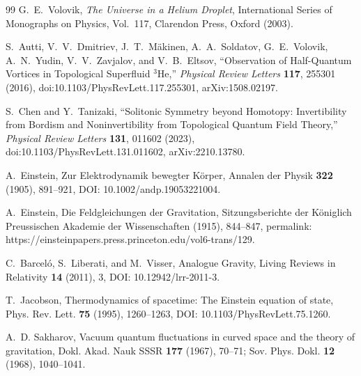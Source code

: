 \documentclass[11pt]{article}
\theoremstyle{definition}
\theoremstyle{plain}
\theoremstyle{remark}
\begin{document}
\begin{thebibliography}{99}
            G.~E.~Volovik,
            \newblock \textit{The Universe in a Helium Droplet},
            \newblock International Series of Monographs on Physics, Vol.~117,
            \newblock Clarendon Press, Oxford (2003).

            S.~Autti, V.~V.~Dmitriev, J.~T.~M\"akinen, A.~A.~Soldatov,
            G.~E.~Volovik, A.~N.~Yudin, V.~V.~Zavjalov, and V.~B.~Eltsov,
            \newblock ``Observation of Half-Quantum Vortices in Topological Superfluid $^3$He,''
            \newblock \textit{Physical Review Letters} \textbf{117}, 255301 (2016),
            \newblock doi:10.1103/PhysRevLett.117.255301,
            \newblock arXiv:1508.02197.

            S.~Chen and Y.~Tanizaki,
            \newblock ``Solitonic Symmetry beyond Homotopy:
            Invertibility from Bordism and Noninvertibility from Topological Quantum Field Theory,''
            \newblock \textit{Physical Review Letters} \textbf{131}, 011602 (2023),
            \newblock doi:10.1103/PhysRevLett.131.011602,
            \newblock arXiv:2210.13780.

            A.~Einstein,
            \newblock Zur Elektrodynamik bewegter K{\"o}rper,
            \newblock Annalen der Physik \textbf{322} (1905), 891--921,
            \newblock DOI: 10.1002/andp.19053221004.

            A.~Einstein,
            \newblock Die Feldgleichungen der Gravitation,
            \newblock Sitzungsberichte der K{\"o}niglich Preussischen Akademie der Wissenschaften (1915), 844--847,
            \newblock permalink: https://einsteinpapers.press.princeton.edu/vol6-trans/129.

            C.~Barcel{\'o}, S.~Liberati, and M.~Visser,
            \newblock Analogue Gravity,
            \newblock Living Reviews in Relativity \textbf{14} (2011), 3,
            \newblock DOI: 10.12942/lrr-2011-3.

            T.~Jacobson,
            \newblock Thermodynamics of spacetime: The Einstein equation of state,
            \newblock Phys. Rev. Lett. \textbf{75} (1995), 1260--1263,
            \newblock DOI: 10.1103/PhysRevLett.75.1260.

            A.~D. Sakharov,
            \newblock Vacuum quantum fluctuations in curved space and the theory of gravitation,
            \newblock Dokl. Akad. Nauk SSSR \textbf{177} (1967), 70--71;
            \newblock Sov. Phys. Dokl. \textbf{12} (1968), 1040--1041.


\end{thebibliography}
\end{document}
